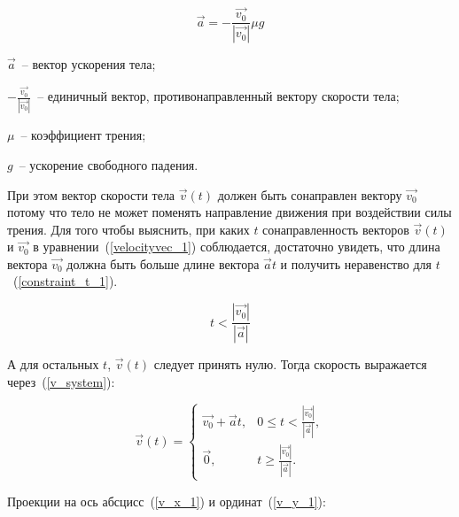\begin{equation}\label{acceleration123}
  \vec{a} = -\frac{\vec{v_0}}{\left|\vec{v_0}\right|} \mu g
\end{equation}

\begin{Underequation}
  \(\vec{a}\)~-- вектор ускорения тела;

  \(-\frac{\vec{v_0}}{\left|\vec{v_0}\right|}\)~-- единичный вектор, противонаправленный вектору скорости тела;

  \(\mu\)~-- коэффициент трения;

  \(g\)~-- ускорение свободного падения.
\end{Underequation}

При этом вектор скорости тела \(\vec{v}(t)\) должен быть сонаправлен вектору \(\vec{v_0}\)
потому что тело не может поменять направление движения при воздействии силы трения.
Для того чтобы выяснить, при каких \(t\) сонаправленность векторов \(\vec{v}(t)\) и \(\vec{v_0}\)
в уравнении~(\ref{velocityvec_1}) соблюдается,
достаточно увидеть, что длина вектора \(\vec{v_0}\) должна быть больше длине вектора \(\vec{a}t\)
и получить неравенство для \(t\)~(\ref{constraint_t_1}).


\newcommand\Constraintt{
  \frac{\left|\vec{v_0}\right|}{\left|\vec{a}\right|}
}

\newcommand\Constrainttle{
  t < \Constraintt
}

\newcommand\Constrainttge{
  t \geqslant \Constraintt
}

\begin{equation}\label{constraint_t_1}
  \Constrainttle
\end{equation}

А для остальных \(t\), \(\vec{v}(t)\) следует принять нулю. Тогда скорость выражается через~(\ref{v_system}):

\begin{equation}\label{v_system}
  \vec{v}(t) =
  \begin{cases}
    \vec{v_0} + \vec{a}t, & 0 \leqslant \Constrainttle, \\
    \vec{0},              & \Constrainttge .
  \end{cases}
\end{equation}

Проекции на ось абсцисс~(\ref{v_x_1}) и ординат~(\ref{v_y_1}):

